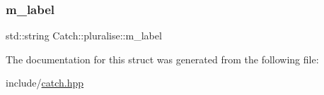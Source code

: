 \mbox{\label{struct_catch_1_1pluralise_a8849cbdd3f11ebe7747597c8644e8793}} 
\subsubsection{\texorpdfstring{m\_label}{m\_label}}
{\footnotesize\ttfamily std\+::string Catch\+::pluralise\+::m\+\_\+label}



The documentation for this struct was generated from the following file\+:\begin{DoxyCompactItemize}
\item 
include/\mbox{\hyperlink{catch_8hpp}{catch.\+hpp}}\end{DoxyCompactItemize}
